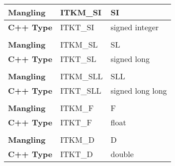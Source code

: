 \begin{table}
\begin{center}
\begin{tabular}{| l | l | l |}
\\ \hline
\textbf{Mangling} & ITKM\_SI & SI \\ \hline
\textbf{C++ Type} & ITKT\_SI & signed integer \\ \hline
\\ \hline
\textbf{Mangling} & ITKM\_SL & SL \\ \hline
\textbf{C++ Type} & ITKT\_SL & signed long \\ \hline
\\ \hline
\textbf{Mangling} & ITKM\_SLL & SLL \\ \hline
\textbf{C++ Type} & ITKT\_SLL & signed long long \\ \hline
\\ \hline
\textbf{Mangling} & ITKM\_F & F \\ \hline
\textbf{C++ Type} & ITKT\_F & float \\ \hline
\\ \hline
\textbf{Mangling} & ITKM\_D & D \\ \hline
\textbf{C++ Type} & ITKT\_D & double \\ \hline
\end{tabular}
\end{center}
\label{tab:WrappingManglingForPODs}
\end{table}

